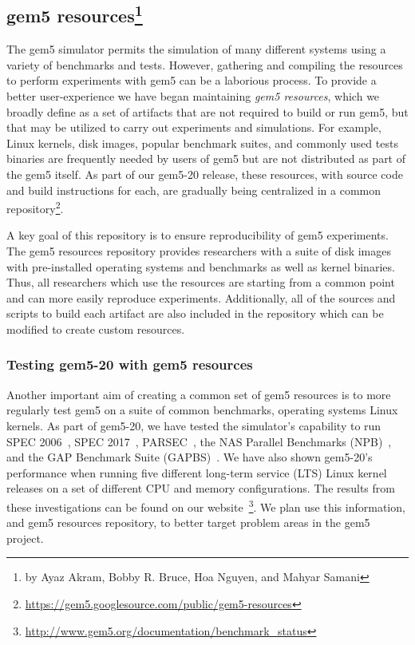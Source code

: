 \subsection[gem5 resources]{gem5 resources\footnote{by Ayaz Akram, Bobby R. Bruce, Hoa Nguyen, and Mahyar Samani}}
\label{sec:resources}

The gem5 simulator permits the simulation of many different systems
using a variety of benchmarks and tests.
However, gathering and compiling the resources to perform experiments with gem5 can be a laborious process.
To provide a better user-experience we have began maintaining \emph{gem5 resources}, which we broadly define as a set of artifacts that are not required to build or run gem5, but that may be utilized to carry out experiments and simulations.
For example, Linux kernels, disk images, popular benchmark suites, and commonly used tests binaries are frequently needed by users of gem5 but are not distributed as part of the gem5 itself.
As part of our gem5-20 release, these resources, with source code and build instructions for each, are gradually being centralized in a common repository\footnote{\url{https://gem5.googlesource.com/public/gem5-resources}}.

A key goal of this repository is to ensure reproducibility of gem5 experiments.
The gem5 resources repository provides researchers with a suite of disk images with pre-installed operating systems and benchmarks as well as kernel binaries.
Thus, all researchers which use the resources are starting from a common point and can more easily reproduce experiments.
Additionally, all of the sources and scripts to build each artifact are also included in the repository which can be modified to create custom resources.

\subsubsection{Testing gem5-20 with gem5 resources}

Another important aim of creating a common set of gem5 resources is to more regularly test gem5 on a suite of common benchmarks, operating systems Linux kernels.
As part of gem5-20, we have tested the simulator's capability to run SPEC 2006~\cite{spec06}, SPEC 2017~\cite{spec17}, PARSEC~\cite{parsec}, the NAS Parallel Benchmarks (NPB)~\cite{npb}, and the GAP Benchmark Suite (GAPBS)~\cite{gapbs}.
We have also shown gem5-20's performance when running five different long-term service (LTS) Linux kernel releases on a set of different CPU and memory configurations.
The results from these investigations can be found on our website~\footnote{\url{http://www.gem5.org/documentation/benchmark_status}}.
We plan use this information, and gem5 resources repository, to better target problem areas in the gem5 project.

